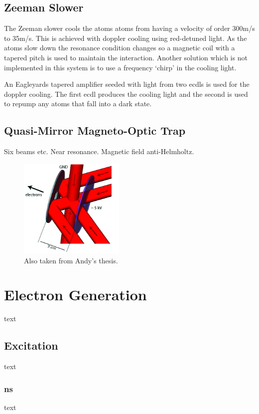 \subsection{Zeeman Slower}
The Zeeman slower cools the atoms atoms from having a velocity of order 300m/s to 35m/s. This is achieved with doppler cooling using red-detuned light. As the atoms slow down the resonance condition changes so a magnetic coil with a tapered pitch is used to maintain the interaction. Another solution which is not implemented in this system is to use a frequency `chirp' in the cooling light.

An Eagleyards tapered amplifier seeded with light from two \glspl{ecdl} is used for the doppler cooling. The first \gls{ecdl} produces the cooling light and the second is used to repump any atoms that fall into a dark state.


    \subsection{Quasi-Mirror Magneto-Optic Trap}

Six beams etc. Near resonance. Magnetic field anti-Helmholtz.

\begin{figure}
\centering
\includegraphics[width=0.45\textwidth]{figs/qMMOT.jpg}
\caption{{\color{red}Also taken from Andy's thesis.}}
\end{figure}

\section{Electron Generation}
text
    \subsection{Excitation}
text
        \subsubsection{ns}
text
